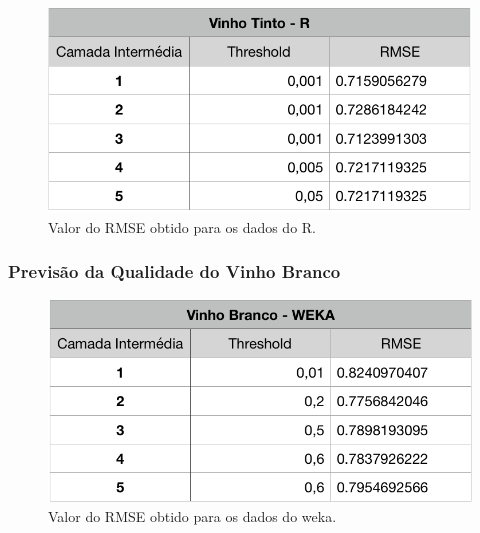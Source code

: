 \documentclass{report}
\begin{document}
\begin{figure}[h!]
\centering
\includegraphics[scale=0.5]{tabelas/2} 
\caption{Valor do RMSE obtido para os dados do R.}
\end{figure} 









\subsubsection{Previsão da Qualidade do Vinho Branco}

\begin{figure}[h!]
\centering
\includegraphics[scale=0.5]{tabelas/3} 
\caption{Valor do RMSE obtido para os dados do weka.}
\end{figure}
\end{document}
